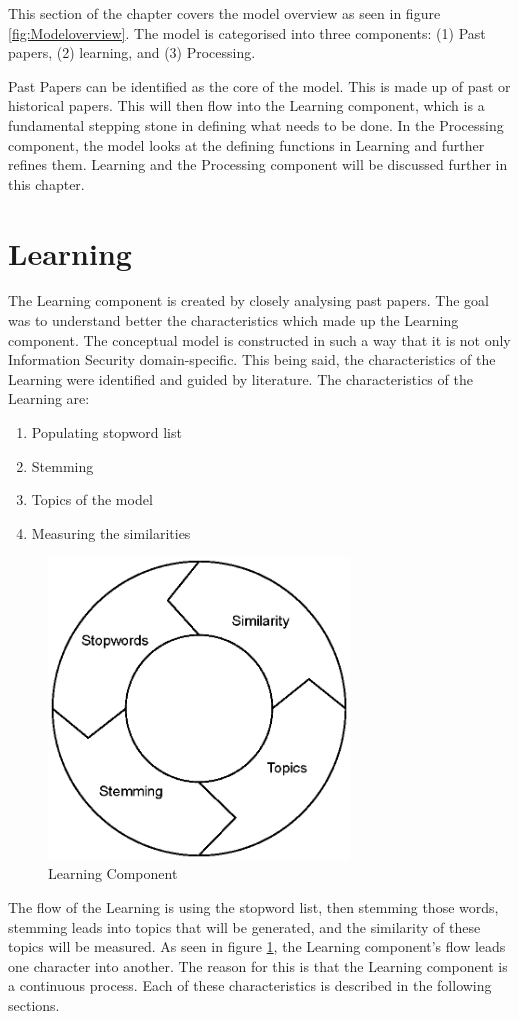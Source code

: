 This section of the chapter covers the model overview as seen in figure \ref{fig:Modeloverview}. The model is categorised into three components: (1) Past papers, (2) learning, and (3) Processing.

Past Papers can be identified as the core of the model. This is made up of past or historical papers. This will then flow into the Learning component, which is a fundamental stepping stone in defining what needs to be done. In the Processing component, the model looks at the defining functions in Learning and further refines them. Learning and the Processing component will be discussed further in this chapter.

\section{Learning}
The Learning component is created by closely analysing past papers. The goal was to understand better the characteristics which made up the Learning component. The conceptual model is constructed in such a way that it is not only Information Security domain-specific. This being said, the characteristics of the Learning were identified and guided by literature. The characteristics of the Learning are:
\begin{enumerate}
    \item Populating stopword list
    \item Stemming
    \item Topics of the model
    \item Measuring the similarities
\end{enumerate}

\begin{figure}[htbp]
\centering
\includegraphics[width=8cm]{./figures/learning.eps}
\caption{Learning Component}
\label{fig:core}
\end{figure}
The flow of the Learning is using the stopword list, then stemming those words,  stemming leads into topics that will be generated, and the similarity of these topics will be measured. As seen in figure \ref{fig:core}, the Learning component's flow leads one character into another. The reason for this is that the Learning component is a continuous process. Each of these characteristics is described in the following sections.

